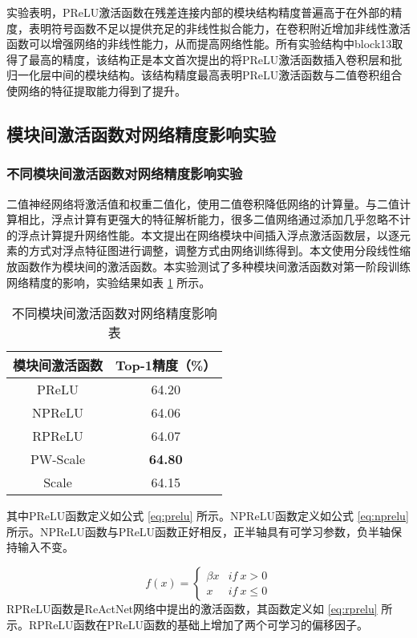 实验表明，PReLU激活函数在残差连接内部的模块结构精度普遍高于在外部的精度，表明符号函数不足以提供充足的非线性拟合能力，在卷积附近增加非线性激活函数可以增强网络的非线性能力，从而提高网络性能。所有实验结构中block13取得了最高的精度，该结构正是本文首次提出的将PReLU激活函数插入卷积层和批归一化层中间的模块结构。该结构精度最高表明PReLU激活函数与二值卷积组合使网络的特征提取能力得到了提升。

\subsection{模块间激活函数对网络精度影响实验}

\subsubsection{不同模块间激活函数对网络精度影响实验}

二值神经网络将激活值和权重二值化，使用二值卷积降低网络的计算量。与二值计算相比，浮点计算有更强大的特征解析能力，很多二值网络通过添加几乎忽略不计的浮点计算提升网络性能。本文提出在网络模块中间插入浮点激活函数层，以逐元素的方式对浮点特征图进行调整，调整方式由网络训练得到。本文使用分段线性缩放函数作为模块间的激活函数。本实验测试了多种模块间激活函数对第一阶段训练网络精度的影响，实验结果如表 \ref{tab:43} 所示。

\begin{table}[htb]
  \vspace{6pt}
  \centering
  \caption{不同模块间激活函数对网络精度影响表}
  \label{tab:43}
  \begin{tabular}{cc}
    \toprule
    模块间激活函数 & Top-1精度（\%） \\
    \midrule
    PReLU & 64.20 \\
    NPReLU & 64.06 \\
    RPReLU & 64.07 \\
    PW-Scale & \textbf{64.80} \\
    Scale & 64.15 \\
    \bottomrule
  \end{tabular}
  \vspace{6pt}
\end{table}

其中PReLU函数定义如公式 \eqref{eq:prelu} 所示。NPReLU函数定义如公式 \eqref{eq:nprelu} 所示。NPReLU函数与PReLU函数正好相反，正半轴具有可学习参数，负半轴保持输入不变。

\begin{equation}
  \label{eq:nprelu}
  f(x) =
  \begin{cases}
    \beta x & if \ x > 0 \\
    x & if \ x \leq 0
  \end{cases}
\end{equation}
RPReLU函数是ReActNet\cite{reactnet}网络中提出的激活函数，其函数定义如 \eqref{eq:rprelu} 所示。RPReLU函数在PReLU函数的基础上增加了两个可学习的偏移因子。

